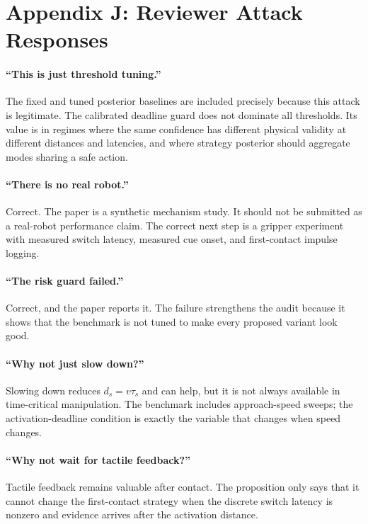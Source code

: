 \documentclass{article}
\begin{document}
\section{Appendix J: Reviewer Attack Responses}

\paragraph{``This is just threshold tuning.''}
The fixed and tuned posterior baselines are included precisely because this attack is legitimate. The calibrated deadline guard does not dominate all thresholds. Its value is in regimes where the same confidence has different physical validity at different distances and latencies, and where strategy posterior should aggregate modes sharing a safe action.

\paragraph{``There is no real robot.''}
Correct. The paper is a synthetic mechanism study. It should not be submitted as a real-robot performance claim. The correct next step is a gripper experiment with measured switch latency, measured cue onset, and first-contact impulse logging.

\paragraph{``The risk guard failed.''}
Correct, and the paper reports it. The failure strengthens the audit because it shows that the benchmark is not tuned to make every proposed variant look good.

\paragraph{``Why not just slow down?''}
Slowing down reduces $d_s=v\tau_s$ and can help, but it is not always available in time-critical manipulation. The benchmark includes approach-speed sweeps; the activation-deadline condition is exactly the variable that changes when speed changes.

\paragraph{``Why not wait for tactile feedback?''}
Tactile feedback remains valuable after contact. The proposition only says that it cannot change the first-contact strategy when the discrete switch latency is nonzero and evidence arrives after the activation distance.
\end{document}
